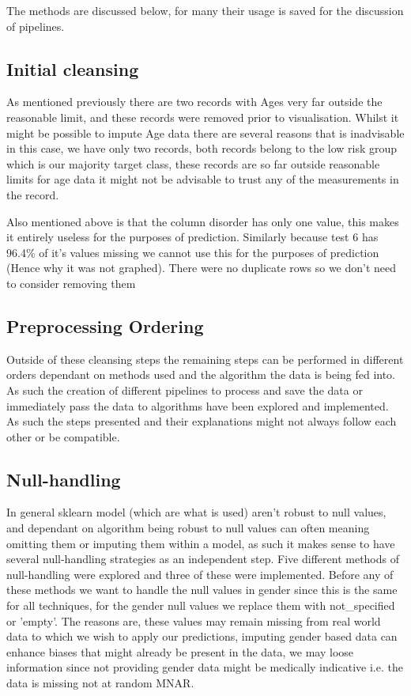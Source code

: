 \documentclass[a4paper]{article}
\begin{document}
The methods are discussed below, for many their usage is saved for the discussion of pipelines.

\subsection{Initial cleansing}\label{removal}

As mentioned previously there are two records with Ages very far outside the reasonable limit, and these records were removed prior to visualisation. Whilst it might be possible to impute Age data there are several reasons that is inadvisable in this case, we have only two records, both records belong to the low risk group which is our majority target class, these records are so far outside reasonable limits for age data it might not be advisable to trust any of the measurements in the record.  

Also mentioned above is that the column disorder has only one value, this makes it entirely useless for the purposes of prediction. Similarly because test 6 has 96.4\% of it's values missing we cannot use this for the purposes of prediction (Hence why it was not graphed). There were no duplicate rows so we don't need to consider removing them


\subsection{Preprocessing Ordering}

Outside of these cleansing steps the remaining steps can be performed in different orders dependant on methods used and the algorithm the data is being fed into. As such the creation of different pipelines to process and save the data or immediately pass the data to algorithms have been explored and implemented.
As such the steps presented and their explanations might not always follow each other or be compatible.

\subsection{Null-handling}
In general sklearn model (which are what is used) aren't robust to null values, and dependant on algorithm being robust to null values can often meaning omitting them or imputing them within a model, as such it makes sense to have several null-handling strategies as an independent step.
Five different methods of null-handling were explored and three of these were implemented. Before any of these methods we want to handle the null values in gender since this is the same for all techniques, for the gender null values we replace them with not\_specified or 'empty'. The reasons are, these values may remain missing from real world data to which we wish to apply our predictions, imputing gender based data can enhance biases that might already be present in the data, we may loose information since not providing gender data might be medically indicative i.e. the data is missing not at random MNAR.
\end{document}
